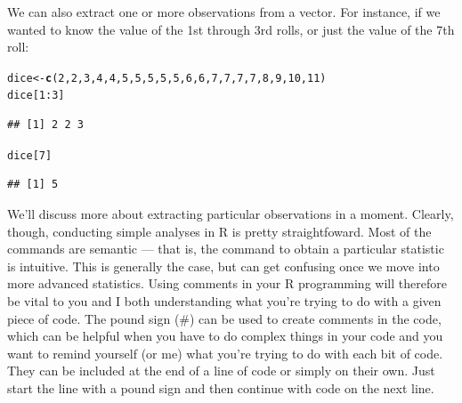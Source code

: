 \documentclass[12pt]{article}\usepackage[]{graphicx}\usepackage[]{color}
\makeatletter
\newcommand{\hlnum}[1]{\textcolor[rgb]{0.686,0.059,0.569}{#1}}%
\newcommand{\hlopt}[1]{\textcolor[rgb]{0,0,0}{#1}}%
\newcommand{\hlstd}[1]{\textcolor[rgb]{0.345,0.345,0.345}{#1}}%
\newcommand{\hlkwb}[1]{\textcolor[rgb]{0.69,0.353,0.396}{#1}}%
\newcommand{\hlkwd}[1]{\textcolor[rgb]{0.737,0.353,0.396}{\textbf{#1}}}%
\newenvironment{kframe}{%
 \def\at@end@of@kframe{}%
 \ifinner\ifhmode%
  \def\at@end@of@kframe{\end{minipage}}%
  \begin{minipage}{\columnwidth}%
 \fi\fi%
 \def\FrameCommand##1{\hskip\@totalleftmargin \hskip-\fboxsep
 \colorbox{shadecolor}{##1}\hskip-\fboxsep
     \hskip-\linewidth \hskip-\@totalleftmargin \hskip\columnwidth}%
 \MakeFramed {\advance\hsize-\width
   \@totalleftmargin\z@ \linewidth\hsize
   \@setminipage}}%
 {\par\unskip\endMakeFramed%
 \at@end@of@kframe}
\newenvironment{knitrout}{}{} %
\makeatother
\begin{document}
We can also extract one or more observations from a vector. For instance, if we wanted to know the value of the 1st through 3rd rolls, or just the value of the 7th roll:
\begin{knitrout}
\color{fgcolor}\begin{kframe}
\begin{alltt}
\hlstd{dice} \hlkwb{<-} \hlkwd{c}\hlstd{(}\hlnum{2}\hlstd{,}\hlnum{2}\hlstd{,}\hlnum{3}\hlstd{,}\hlnum{4}\hlstd{,}\hlnum{4}\hlstd{,}\hlnum{5}\hlstd{,}\hlnum{5}\hlstd{,}\hlnum{5}\hlstd{,}\hlnum{5}\hlstd{,}\hlnum{5}\hlstd{,}\hlnum{6}\hlstd{,}\hlnum{6}\hlstd{,}\hlnum{7}\hlstd{,}\hlnum{7}\hlstd{,}\hlnum{7}\hlstd{,}\hlnum{7}\hlstd{,}\hlnum{8}\hlstd{,}\hlnum{9}\hlstd{,}\hlnum{10}\hlstd{,}\hlnum{11}\hlstd{)}
\hlstd{dice[}\hlnum{1}\hlopt{:}\hlnum{3}\hlstd{]}
\end{alltt}
\begin{verbatim}
## [1] 2 2 3
\end{verbatim}
\begin{alltt}
\hlstd{dice[}\hlnum{7}\hlstd{]}
\end{alltt}
\begin{verbatim}
## [1] 5
\end{verbatim}
\end{kframe}
\end{knitrout}
We'll discuss more about extracting particular observations in a moment. Clearly, though, conducting simple analyses in R is pretty straightfoward. Most of the commands are semantic --- that is, the command to obtain a particular statistic is intuitive. This is generally the case, but can get confusing once we move into more advanced statistics. Using comments in your R programming will therefore be vital to you and I both understanding what you're trying to do with a given piece of code. The pound sign (\#) can be used to create comments in the code, which can be helpful when you have to do complex things in your code and you want to remind yourself (or me) what you're trying to do with each bit of code. They can be included at the end of a line of code or simply on their own. Just start the line with a pound sign and then continue with code on the next line.
\end{document}

